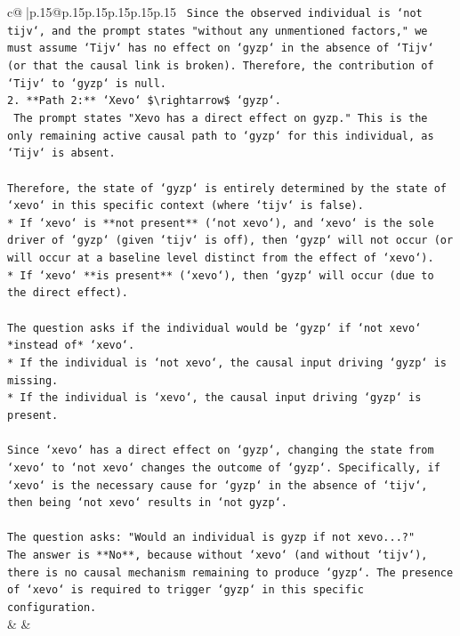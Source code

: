 \documentclass{article}
\begin{document}
{\begin{supertabular}{c@{$\;$}|p{.15\linewidth}@{}p{.15\linewidth}p{.15\linewidth}p{.15\linewidth}p{.15\linewidth}p{.15\linewidth}}
{{{\texttt{    Since the observed individual is `not tijv`, and the prompt states "without any unmentioned factors," we must assume `Tijv` has no effect on `gyzp` in the absence of `Tijv` (or that the causal link is broken). Therefore, the contribution of `Tijv` to `gyzp` is null.} \\
\texttt{2.  **Path 2:** `Xevo` \$\textbackslash{}rightarrow\$ `gyzp`.} \\
\texttt{    The prompt states "Xevo has a direct effect on gyzp." This is the only remaining active causal path to `gyzp` for this individual, as `Tijv` is absent.} \\
\\ 
\texttt{Therefore, the state of `gyzp` is entirely determined by the state of `xevo` in this specific context (where `tijv` is false).} \\
\texttt{*   If `xevo` is **not present** (`not xevo`), and `xevo` is the sole driver of `gyzp` (given `tijv` is off), then `gyzp` will not occur (or will occur at a baseline level distinct from the effect of `xevo`).} \\
\texttt{*   If `xevo` **is present** (`xevo`), then `gyzp` will occur (due to the direct effect).} \\
\\ 
\texttt{The question asks if the individual would be `gyzp` if `not xevo` *instead of* `xevo`.} \\
\texttt{*   If the individual is `not xevo`, the causal input driving `gyzp` is missing.} \\
\texttt{*   If the individual is `xevo`, the causal input driving `gyzp` is present.} \\
\\ 
\texttt{Since `xevo` has a direct effect on `gyzp`, changing the state from `xevo` to `not xevo` changes the outcome of `gyzp`. Specifically, if `xevo` is the necessary cause for `gyzp` in the absence of `tijv`, then being `not xevo` results in `not gyzp`.} \\
\\ 
\texttt{The question asks: "Would an individual is gyzp if not xevo...?"} \\
\texttt{The answer is **No**, because without `xevo` (and without `tijv`), there is no causal mechanism remaining to produce `gyzp`. The presence of `xevo` is required to trigger `gyzp` in this specific configuration.} \\
            }
        }
    }
    & & \\ \\


\end{supertabular}}
\end{document}
